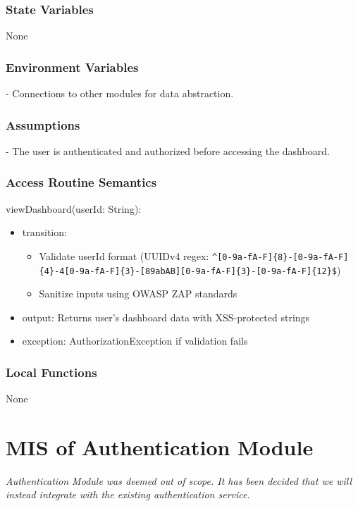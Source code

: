 \documentclass[12pt, titlepage]{article}
\begin{document}
\subsubsection{State Variables}
None

\subsubsection{Environment Variables}
- Connections to other modules for data abstraction.

\subsubsection{Assumptions}
- The user is authenticated and authorized before accessing the dashboard.

\subsubsection{Access Routine Semantics}
\noindent viewDashboard(userId: String):
\begin{itemize}
  \item transition: 
    \begin{itemize}
      \item Validate userId format (UUIDv4 regex: \texttt{\^{}[0-9a-fA-F]\{8\}-[0-9a-fA-F]\{4\}-4[0-9a-fA-F]\{3\}-[89abAB][0-9a-fA-F]\{3\}-[0-9a-fA-F]\{12\}\$})
      \item Sanitize inputs using OWASP ZAP standards
    \end{itemize}
  \item output: Returns user's dashboard data with XSS-protected strings
  \item exception: AuthorizationException if validation fails
\end{itemize}

\subsubsection{Local Functions}
None

\section{MIS of Authentication Module} \label{AuthenticationModule}

\textit{Authentication Module was deemed out of scope. It has been decided that we will instead integrate with the existing authentication service.}
\end{document}

